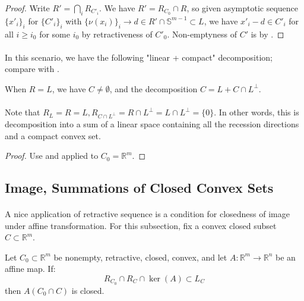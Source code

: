 \begin{proof}
	Write $R'=\bigcap_iR_{C'_i}$. We have $R'=R_{C_0}\cap R$, so given asymptotic sequence $\{x'_i\}_i$ for $\{C'_i\}_i$ with $\{\nu(x_i)\}_i\to d\in R'\cap \mathbb{S}^{m-1}\subset L$, we have $x'_i-d\in C'_i$ for all $i\geq i_0$ for some $i_0$ by retractiveness of $C'_0$. Non-emptyness of $C'$ is by .
\end{proof}

\paragraph{}In this scenario, we have the following "linear + compact" decomposition; compare with .

\begin{coro}\label{coro:014-decomp-compact}
	When $R=L$, we have $C\neq\emptyset$, and the decomposition $C=L+C\cap L^\perp$.
\end{coro}

\paragraph{}Note that $R_L=R=L,R_{C\cap L^{\perp}}=R\cap L^\perp=L\cap L^\perp=\{0\}$. In other words, this is decomposition into a sum of a linear space containing all the recession directions and a compact convex set.

\begin{proof}
	Use  and  applied to $C_0=\mathbb{R}^m$.
\end{proof}

\subsection{Image, Summations of Closed Convex Sets}

\paragraph{}A nice application of retractive sequence is a condition for closedness of image under affine transformation. For this subsection, fix a convex closed subset $C\subset \mathbb{R}^m$.

\begin{coro}\label{coro:014-closed-affine}
	Let $C_0\subset \mathbb{R}^m$ be nonempty, retractive, closed, convex, and let $A:\mathbb{R}^m\to \mathbb{R}^n$ be an affine map. If:
	\[
		R_{C_0}\cap R_C\cap \operatorname{ker}(A)\subset L_C
	\]
	then $A(C_0\cap C)$ is closed.
\end{coro}

